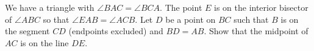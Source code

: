 We have a triangle with $ \angle BAC=\angle BCA. $ The point $ E $ is on the interior bisector of $ \angle ABC $ so that $ \angle EAB =\angle ACB. $ Let $ D $ be a point on $ BC $ such that $ B $ is on the segment $ CD $ (endpoints excluded) and $ BD=AB. $ Show that the midpoint of $ AC $ is on the line $ DE. $